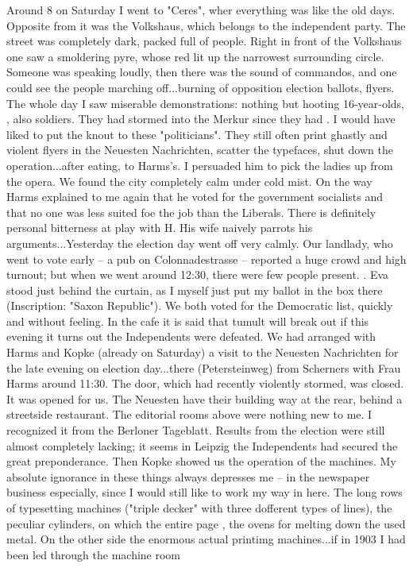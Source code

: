 
Around 8 on Saturday I went to "Ceres", wher everything was like the old days. Opposite from it was the Volkshaus, which belongs to the independent party. The street was completely dark, packed full of people. Right in front of the Volkshaus one saw a smoldering pyre, whose red lit up the narrowest surrounding circle. Someone was speaking loudly, then there was the sound of commandos, and one could see the people marching off...burning of opposition election ballots, flyers. The whole day I saw miserable demonstrations: nothing but hooting 16-year-olds, , also soldiers. They had stormed into the Merkur since they had . I would have liked to put the knout to these "politicians". They still often print ghastly and violent flyers in the Neuesten Nachrichten, scatter the typefaces, shut down the operation...after eating, to Harms's. I persuaded him to pick the ladies up from the opera. We found the city completely calm under cold mist. On the way Harms explained to me again that he voted for the government socialists and that no one was less suited foe the job than the Liberals. There is definitely personal bitterness at play with H. His wife naively parrots his arguments...Yesterday the election day went off very calmly. Our landlady, who went to vote early -- a pub on Colonnadestrasse -- reported a huge crowd and high turnout; but when we went around 12:30, there were few people present. . Eva stood just behind the curtain, as I myself just put my ballot in the box there (Inscription: "Saxon Republic"). We both voted for the Democratic list, quickly and without feeling. In the cafe it is said that tumult will break out if this evening it turns out the Independents were defeated. We had arranged with Harms and Kopke (already on Saturday) a visit to the Neuesten Nachrichten for the late evening on election day...there (Petersteinweg) from Scherners with Frau Harms around 11:30. The door, which had recently violently stormed, was closed. It was opened for us. The Neuesten have their building way at the rear, behind a streetside restaurant. The editorial rooms above were nothing new to me. I recognized it from the Berloner Tageblatt. Results from the election were still almost completely lacking; it seems in Leipzig the Independents had secured the great preponderance. Then Kopke showed us the operation of the machines. My absolute ignorance in these things always depresses me -- in the newspaper business especially, since I would still like to work my way in here. The long rows of typesetting machines  ("triple decker" with three dofferent types of lines), the peculiar cylinders, on which the entire page , the ovens for melting down the used metal. On the other side the enormous actual printimg machines...if in 1903 I had been led through the machine room 